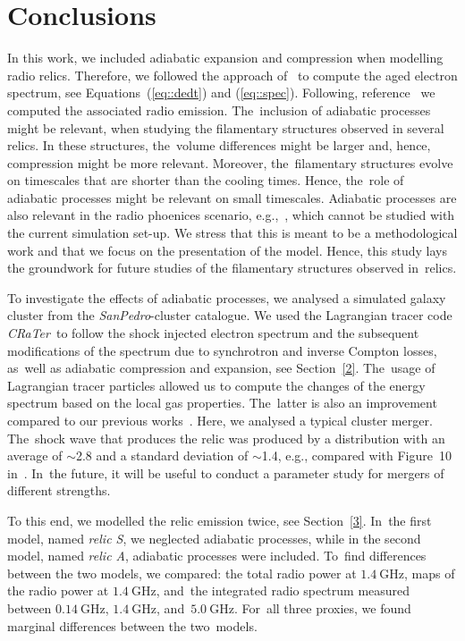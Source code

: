 \documentclass[galaxies,article,accept,moreauthors,pdftex]{mdpi}
\newcommand{\CRaTer}{{\it {\small CRaTer}}}
\newcommand{\GHz}{\mathrm{GHz}}
\newcommand{\relicA}{\textit{relic A}}
\newcommand{\relicS}{\textit{relic S}}
\begin{document}
\section{Conclusions}\label{4}

In this work, we included adiabatic expansion and compression when mo\-del\-ling radio relics. Therefore, we followed the approach of~\cite{ensslin2001} to compute the aged electron spectrum, see Equations~(\ref{eq::dedt}) and (\ref{eq::spec}). Following, reference~\cite{2007MNRAS.375...77H} we computed the associated radio emission. The~inclusion of adiabatic processes might be relevant, when studying the filamentary structures observed in several relics. {{In these structures, the~volume differences might be larger and, hence, compression might be more relevant. Moreover, the~filamentary structures evolve on timescales that are shorter than the cooling times. Hence, the~role of adiabatic processes might be relevant on small timescales.}} {{Adiabatic processes are also relevant in the radio phoenices scenario, e.g.,~\citep{ensslin2001,2002MNRAS.331.1011E,2015MNRAS.448.2197D,2020A&A...634A...4M}, which cannot be studied with the current simulation set-up.}} We stress that this is meant to be a methodological work and that we focus on the presentation of the model. Hence, this study lays the groundwork for future studies of the filamentary structures observed in~relics.

To investigate the effects of adiabatic processes, we analysed a simulated galaxy cluster from the \textit{SanPedro}-cluster catalogue. We used the Lagrangian tracer code \CRaTer \ to follow the shock injected electron spectrum and the subsequent modifications of the spectrum due to synchrotron and inverse Compton losses, as~well as adiabatic compression and expansion, see Section~\ref{2}. The~usage of Lagrangian tracer particles allowed us to compute the changes of the energy spectrum based on the local gas properties. The~latter is also an improvement compared to our previous works~\cite{wittor2019pol,wittor2021mach}. {{Here, we analysed a typical cluster merger. The~shock wave that produces the relic was produced by a distribution with an average of $\sim$2.8 and a standard deviation of $\sim$1.4, e.g., compared with Figure~10 in~\citep{wittor2021mach}. In~the future, it will be useful to conduct a parameter study for mergers of different strengths.}}

To this end, we modelled the relic emission twice, see Section~\ref{3}. In~the first model, named \relicS, we neglected adiabatic processes, while in the second model, named \relicA, adiabatic processes were included. To~find differences between the two models, we compared: the total radio power at $1.4 \ \GHz$, maps of the radio power at $1.4 \ \GHz$, and~the integrated radio spectrum measured between $0.14 \ \GHz$, $1.4 \ \GHz$, and~$5.0 \ \GHz$. For~all three proxies, we found marginal differences between the two~models. 
\end{document}
